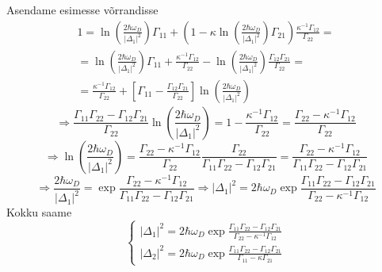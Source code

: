 \documentclass[class=article, crop=false]{standalone}
\begin{document}
Asendame esimesse võrrandisse
\begin{equation}\label{key}
	\begin{split}
		1 = \ln \left( \frac{2 \hbar \omega_{D}}{ \left| \Delta_{ 1} \right|^{2}} \right) \Gamma_{11} + \left( 1 - \kappa \ln \left( \frac{2 \hbar \omega_{D}}{ \left| \Delta_{ 1} \right|^{2}} \right) \Gamma_{21} \right) \frac{ \kappa^{-1} \Gamma_{12}}{ \Gamma_{22}} = \\
		= \ln \left( \frac{2 \hbar \omega_{D}}{ \left| \Delta_{ 1} \right|^{2}} \right) \Gamma_{11} + \frac{ \kappa^{-1} \Gamma_{12}}{ \Gamma_{22}} - \ln \left( \frac{2 \hbar \omega_{D}}{ \left| \Delta_{ 1} \right|^{2}} \right) \frac{ \Gamma_{12} \Gamma_{21}}{ \Gamma_{22}} = \\
		= \frac{ \kappa^{-1} \Gamma_{12}}{ \Gamma_{22}} + \left[ \Gamma_{11} - \frac{ \Gamma_{12} \Gamma_{21}}{ \Gamma_{22}} \right] \ln \left( \frac{2 \hbar \omega_{D}}{ \left| \Delta_{ 1} \right|^{2}} \right)
	\end{split}
\end{equation}
\begin{equation}\label{key}
	\Rightarrow \frac{ \Gamma_{11} \Gamma_{22} - \Gamma_{12} \Gamma_{21}}{ \Gamma_{22}} \ln \left( \frac{2 \hbar \omega_{D}}{ \left| \Delta_{ 1} \right|^{2}} \right) = 1 - \frac{ \kappa^{-1} \Gamma_{12}}{ \Gamma_{22}} = \frac{ \Gamma_{22} - \kappa^{-1} \Gamma_{12}}{ \Gamma_{22}}
\end{equation}
\begin{equation}\label{key}
	\Rightarrow \ln \left( \frac{2 \hbar \omega_{D}}{ \left| \Delta_{ 1} \right|^{2}} \right) = \frac{ \Gamma_{22} - \kappa^{-1} \Gamma_{12}}{ \Gamma_{22}} \frac{ \Gamma_{22}}{ \Gamma_{11} \Gamma_{22} - \Gamma_{12} \Gamma_{21}} = \frac{ \Gamma_{22} - \kappa^{-1} \Gamma_{12}}{ \Gamma_{11} \Gamma_{22} - \Gamma_{12} \Gamma_{21}}
\end{equation}
\begin{equation}\label{key}
	\Rightarrow \frac{2 \hbar \omega_{D}}{ \left| \Delta_{ 1} \right|^{2}} = \exp \frac{ \Gamma_{22} - \kappa^{-1} \Gamma_{12}}{ \Gamma_{11} \Gamma_{22} - \Gamma_{12} \Gamma_{21}} \Rightarrow \left| \Delta_{ 1} \right|^{2} = 2 \hbar \omega_{D} \exp \frac{ \Gamma_{11} \Gamma_{22} - \Gamma_{12} \Gamma_{21}}{ \Gamma_{22} - \kappa^{-1} \Gamma_{12}}
\end{equation}
Kokku saame
\begin{equation}\label{key}
	\begin{cases}
		\left| \Delta_{ 1} \right|^{2} = 2 \hbar \omega_{D} \exp \frac{ \Gamma_{11} \Gamma_{22} - \Gamma_{12} \Gamma_{21}}{ \Gamma_{22} - \kappa^{-1} \Gamma_{12}} \\
		\left| \Delta_{2} \right|^{2} = 2 \hbar \omega_{D} \exp \frac{ \Gamma_{11} \Gamma_{22} - \Gamma_{12} \Gamma_{21}}{ \Gamma_{11} - \kappa \Gamma_{21}}
	\end{cases}
\end{equation}
\end{document}
